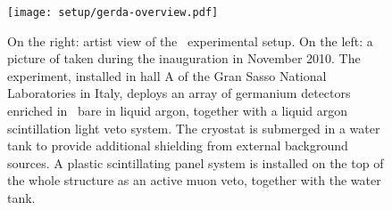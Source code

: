 \begin{figure}
  \centering
  \texttt{[image: setup/gerda-overview.pdf]}
  \caption{%
    On the right: artist view of the \gerda\ experimental setup. On the left: a picture of
    taken during the inauguration in November 2010. The experiment, installed in hall A of
    the Gran Sasso National Laboratories in Italy, deploys an array of germanium detectors
    enriched in \gesix\ bare in liquid argon, together with a liquid argon scintillation
    light veto system. The cryostat is submerged in a water tank to provide additional
    shielding from external background sources. A plastic scintillating panel system is
    installed on the top of the whole structure as an active muon veto, together with the
    water tank.
  }\label{fig:setup:overview}
\end{figure}

